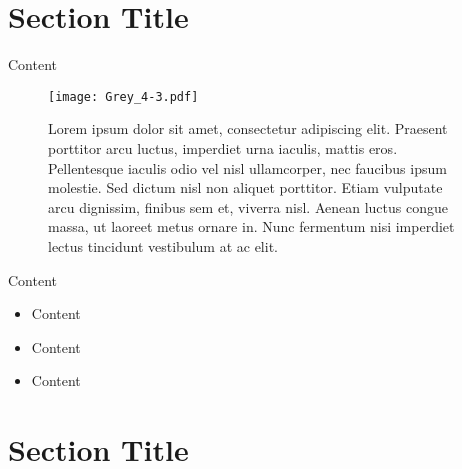 \documentclass[
]{ImperialPoster}
\begin{document}
\begin{multicols}{3}
	\columnbreak{} %

	\section{Section Title}

	Content


	\begin{figure}[H] %
		\texttt{[image: Grey\_4-3.pdf]} %
		\parbox{0.66\textwidth}{\caption{Lorem ipsum dolor sit amet, consectetur adipiscing elit. Praesent porttitor arcu luctus, imperdiet urna iaculis, mattis eros. Pellentesque iaculis odio vel nisl ullamcorper, nec faucibus ipsum molestie. Sed dictum nisl non aliquet porttitor. Etiam vulputate arcu dignissim, finibus sem et, viverra nisl. Aenean luctus congue massa, ut laoreet metus ornare in. Nunc fermentum nisi imperdiet lectus tincidunt vestibulum at ac elit.}} %
	\end{figure}


	Content


	\begin{itemize}
		\item Content
		\item Content
		\item Content
	\end{itemize}

	\columnbreak{} %

	\section{Section Title}


\end{multicols}
\end{document}
